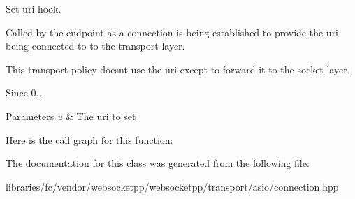 Set uri hook. 

Called by the endpoint as a connection is being established to provide the uri being connected to to the transport layer.

This transport policy doesn\textquotesingle{}t use the uri except to forward it to the socket layer.

\begin{DoxySince}{Since}
0..
\end{DoxySince}

\begin{DoxyParams}{Parameters}
{\em u} & The uri to set \\
\hline
\end{DoxyParams}
Here is the call graph for this function\+:


The documentation for this class was generated from the following file\+:\begin{DoxyCompactItemize}
\item 
libraries/fc/vendor/websocketpp/websocketpp/transport/asio/connection.\+hpp\end{DoxyCompactItemize}
